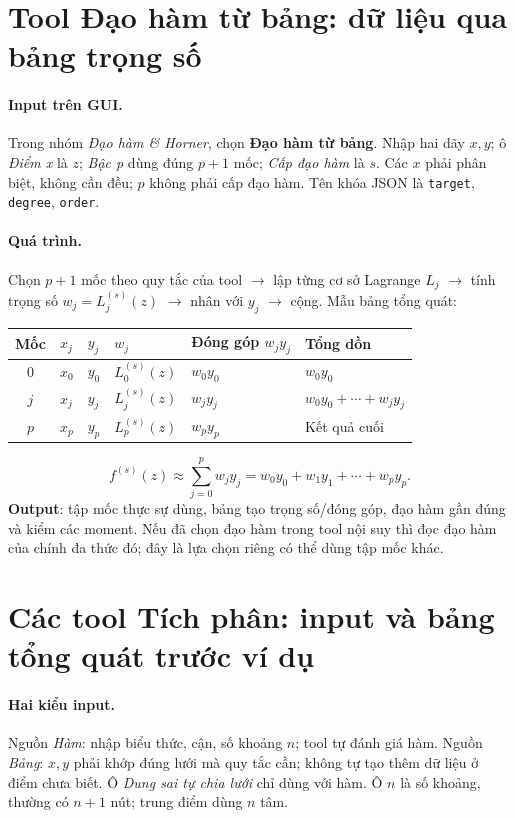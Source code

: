 \section{Tool Đạo hàm từ bảng: dữ liệu qua bảng trọng số}
\paragraph{Input trên GUI.} Trong nhóm \emph{Đạo hàm \& Horner}, chọn \textbf{Đạo hàm từ bảng}. Nhập hai dãy $x,y$; ô \emph{Điểm x} là $z$; \emph{Bậc p} dùng đúng $p+1$ mốc; \emph{Cấp đạo hàm} là $s$. Các $x$ phải phân biệt, không cần đều; $p$ không phải cấp đạo hàm. Tên khóa JSON là \texttt{target}, \texttt{degree}, \texttt{order}.
\paragraph{Quá trình.} Chọn $p+1$ mốc theo quy tắc của tool $\to$ lập từng cơ sở Lagrange $L_j$ $\to$ tính trọng số $w_j=L_j^{(s)}(z)$ $\to$ nhân với $y_j$ $\to$ cộng. Mẫu bảng tổng quát:
\begin{center}\small\begin{tabular}{clllll}\toprule
Mốc&$x_j$&$y_j$&$w_j$&Đóng góp $w_jy_j$&Tổng dồn\\\midrule
0&$x_0$&$y_0$&$L_0^{(s)}(z)$&$w_0y_0$&$w_0y_0$\\
$j$&$x_j$&$y_j$&$L_j^{(s)}(z)$&$w_jy_j$&$w_0y_0+\cdots+w_jy_j$\\
$p$&$x_p$&$y_p$&$L_p^{(s)}(z)$&$w_py_p$&Kết quả cuối\\\bottomrule
\end{tabular}\end{center}
\[
f^{(s)}(z)\approx\sum_{j=0}^pw_jy_j=w_0y_0+w_1y_1+\cdots+w_py_p.
\]
\textbf{Output}: tập mốc thực sự dùng, bảng tạo trọng số/đóng góp, đạo hàm gần đúng và kiểm các moment. Nếu đã chọn đạo hàm trong tool nội suy thì đọc đạo hàm của chính đa thức đó; đây là lựa chọn riêng có thể dùng tập mốc khác.

\section{Các tool Tích phân: input và bảng tổng quát trước ví dụ}

\paragraph{Hai kiểu input.} Nguồn \emph{Hàm}: nhập biểu thức, cận, số khoảng $n$; tool tự đánh giá hàm. Nguồn \emph{Bảng}: $x,y$ phải khớp đúng lưới mà quy tắc cần; không tự tạo thêm dữ liệu ở điểm chưa biết. Ô \emph{Dung sai tự chia lưới} chỉ dùng với hàm. Ô $n$ là số khoảng, thường có $n+1$ nút; trung điểm dùng $n$ tâm.

